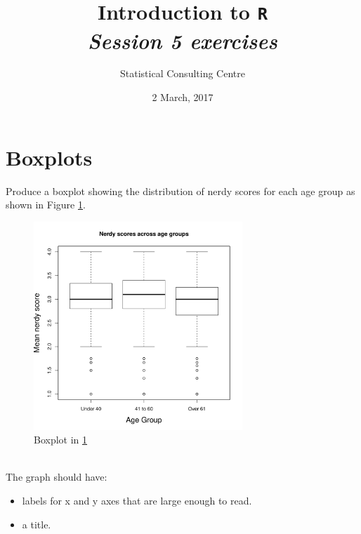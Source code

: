 \documentclass[12pt,a4paper]{article}\usepackage[]{graphicx}\usepackage[]{color}
\newenvironment{knitrout}{}{} %
\begin{document}
\setlength\parindent{0cm}
\title{\Large{\textbf{Introduction to \texttt{R}}}\\
\textit{Session 5 exercises}}
\author{Statistical Consulting Centre}
\date{2 March, 2017}
\maketitle
 
 

\section{Boxplots}
\label{sec:box}
Produce a boxplot showing the distribution of nerdy scores for each age group as shown in Figure \ref{fig:box1}.
\begin{figure}[h]   
 \centering
\begin{knitrout}
\color{fgcolor}
\includegraphics[width=0.7\textwidth]{figure/box1-1} 

\end{knitrout}
\caption{Boxplot in \ref{sec:box}}
  \label{fig:box1}
\end{figure}\\
The graph should have:
\begin{itemize}
\item labels for x and y axes that are large enough to read.
\item a title.
\end{itemize}
\end{document}
